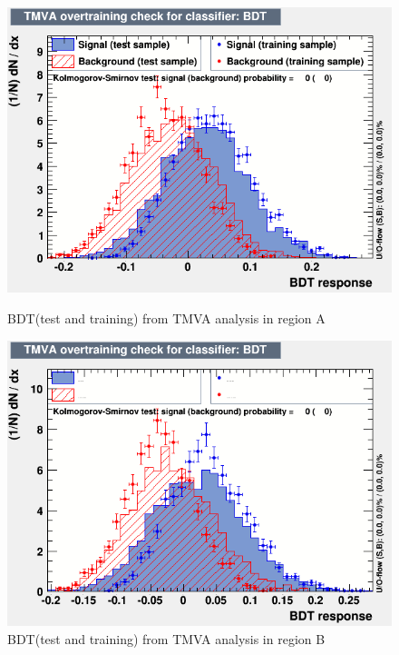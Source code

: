 \documentclass[english]{article}
\begin{document}
\begin{figure}[!htb]
	\includegraphics[width=\linewidth]{BDT_tt_A}
	\caption{BDT(test and training) from TMVA analysis in region A}
\endminipage\hfill
{}
	\includegraphics[width=\linewidth]{BDT_tt_B}
	\caption{BDT(test and training) from TMVA analysis in region B}
\endminipage\hfill
\end{figure}

\end{document}
